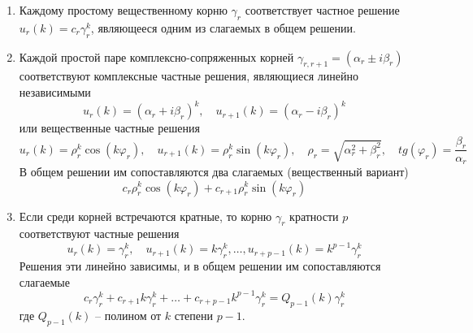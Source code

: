 \documentclass[../../calc-math-exam-2023.tex]{subfiles}
\begin{document}
    \begin{enumerate}
        \item Каждому простому вещественному корню $\displaystyle \gamma_r$ соответствует частное решение
        $\displaystyle u_r(k) = c_r\gamma_r^k$, являющееся одним из слагаемых в общем решении.
        \item Каждой простой паре комплексно-сопряженных корней $\displaystyle \gamma_{r, r+1} = \left( \alpha_r \pm i\beta_r \right)$
        соответствуют комплексные частные решения, являющиеся линейно независимыми
        \begin{equation*}
            u_r(k) = \left( \alpha_r + i\beta_r \right)^k, \quad u_{r+1}(k) = \left( \alpha_r - i\beta_r \right)^k
        \end{equation*}
        или вещественные частные решения
        \begin{equation*}
            u_r(k) = \rho_r^k \cos(k\varphi_r), \quad u_{r+1}(k) = \rho_r^k \sin(k\varphi_r), \quad \rho_r = \sqrt{\alpha_r^2 + \beta_r^2}, \quad tg(\varphi_r) = \frac{\beta_r}{\alpha_r}
        \end{equation*}
        В общем решении им сопоставляются два слагаемых (вещественный вариант)
        \begin{equation*}
            c_r \rho_r^k \cos(k\varphi_r) + c_{r+1}\rho_r^k \sin(k\varphi_r)
        \end{equation*}
        \item Если среди корней встречаются кратные, то корню $\gamma_r$ кратности $p$ соответствуют частные решения
        \begin{equation*}
            u_r(k) = \gamma_r^k, \quad u_{r+1}(k) = k\gamma_r^k, \dots, u_{r+p-1}(k) = k^{p-1}\gamma_r^k
        \end{equation*}
        Решения эти линейно зависимы, и в общем решении им сопоставляются слагаемые
        \begin{equation*}
            c_r\gamma_r^k + c_{r+1}k\gamma_r^k + \dots + c_{r+p-1}k^{p-1}\gamma_r^k = Q_{p-1}(k)\gamma_r^k
        \end{equation*}
        где $\displaystyle Q_{p-1}(k)$ -- полином от $k$ степени $p-1$.
    \end{enumerate}
\end{document}
